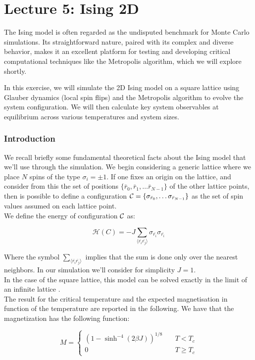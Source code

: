 \chapter*{Lecture 5: Ising 2D}

The Ising model is often regarded as the undisputed benchmark for Monte Carlo simulations. Its straightforward nature, paired with its complex and diverse behavior, makes it an excellent platform for testing and developing critical computational techniques like the Metropolis algorithm, which we will explore shortly.

In this exercise, we will simulate the 2D Ising model on a square lattice using Glauber dynamics (local spin flips) and the Metropolis algorithm to evolve the system configuration. We will then calculate key system observables at equilibrium across various temperatures and system sizes.
\subsection{Introduction}

We recall briefly some fundamental theoretical facts about the Ising model that we'll use through the simulation.
We begin considering a generic lattice where we place $N$ spins of the type $\sigma_i  = \pm 1$. If one fixes an origin on the lattice, and consider
from this the set of positions $\{\bar{r}_0, \bar{r}_1, \dots \bar{r}_{N-1}\}$ of the other lattice points, then is possible 
to define a configuration $\mathcal{C} = \{\sigma_{\bar{r}_0}, \dots \sigma_{\bar{r}_{N-1}}\}$ as the set of spin values assumed on each lattice point. \\
We define the energy of configuration $\mathcal{C}$ as:

$$
\mathcal{H}(C) = -J \sum_{\langle \bar{r_i}\bar{r_j} \rangle} \sigma_{\bar{r_i}} \sigma_{\bar{r_i}}
$$

Where the symbol $\sum_{\langle \bar{r_i}\bar{r_j} \rangle}$ implies that the sum is done only over the nearest neighbors. In our simulation 
we'll consider for simplicity $J=1$. \\

In the case of the square lattice, this model can be solved exactly in the limit of an infinite lattice \cite{Onsager-1944}. \\
The result for the critical temperature and the expected magnetisation in function
of the temperature are reported in the following.
We have that the magnetization has the following function:

$$
M = 
\begin{cases}
(1-\sinh^{-4}(2\beta J))^{1/8} \quad&T<T_c\\
0 &T \geq T_c    
\end{cases}
$$

